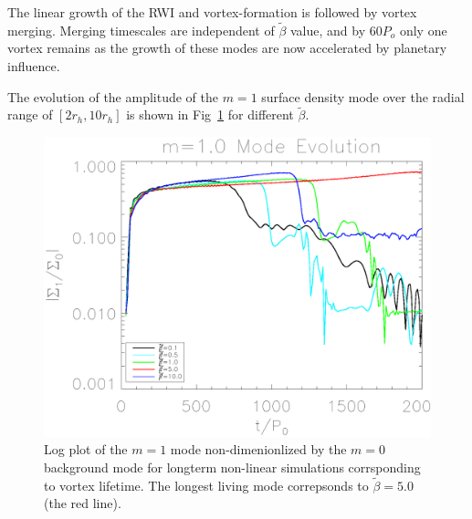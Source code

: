 The linear growth of the RWI and vortex-formation is followed by 
vortex merging. Merging timescales are independent of $\tilde\beta$ value,
 and by $60P_o$ only one vortex remains as the growth of these modes are now
 accelerated by planetary influence.

The evolution of the amplitude of the $m=1$ surface density mode
 over the radial range of $[2r_h,10r_h]$ is shown in Fig~\ref{lifetimeplot}
 for different $\tilde\beta$.


\begin{figure}
  \includegraphics[width=\linewidth,clip=true,trim=0.5cm
    0cm 0cm 1cm]{figures/longterm_stability}
  \caption{Log plot of the $m=1$ mode non-dimenionlized by the $m=0$
    background mode for longterm non-linear simulations corrsponding
    to vortex lifetime. The longest living mode correpsonds to
    $\tilde\beta=5.0$ (the red line). \label{lifetimeplot}} 
\end{figure}

